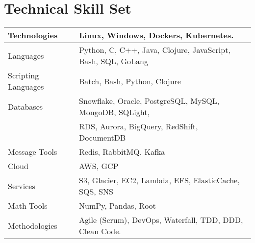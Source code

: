 \section{Technical Skill Set}

\begin{center}
  \begin{tabular}{|| l | l ||}
      \hline
      Technologies & Linux, Windows, Dockers, Kubernetes. \\
      \hline
      Languages & Python, C, C++, Java, Clojure, JavaScript, Bash, SQL, GoLang \\
    \hline
      Scripting Languages \hspace{3mm} & Batch, Bash, Python, Clojure \\
    \hline
      Databases & Snowflake, Oracle, PostgreSQL, MySQL, MongoDB, SQLight, \\ & RDS, Aurora, BigQuery, RedShift, DocumentDB \\
    \hline
      Message Tools & Redis, RabbitMQ, Kafka \\
    \hline
      Cloud & AWS, GCP \\
    \hline
      Services & S3, Glacier, EC2, Lambda, EFS, ElasticCache, SQS, SNS \hspace{3mm} \\
    \hline
      Math Tools & NumPy, Pandas, Root \\
    \hline
      Methodologies & Agile (Scrum), DevOps, Waterfall, TDD, DDD, Clean Code. \\
    \hline
  \end{tabular}
\end{center}

